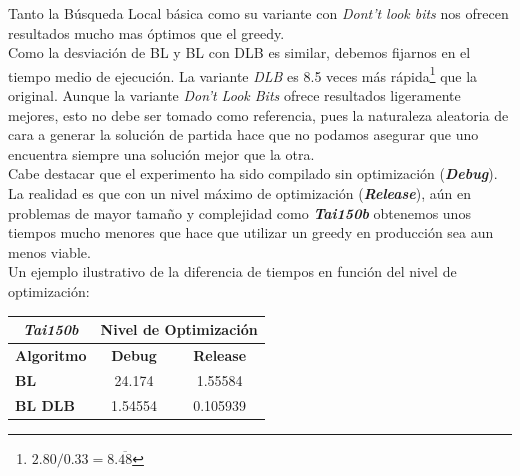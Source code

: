 \documentclass[a4paper, 12pt]{article}
\begin{document}
      Tanto la Búsqueda Local básica como su variante con \textit{Dont't look bits} nos ofrecen resultados mucho mas óptimos que el greedy. \\
      
      Como la desviación de BL y BL con DLB es similar, debemos fijarnos en el tiempo medio de ejecución. La variante \textit{DLB} es 8.5 veces más rápida\footnote{$2.80/0.33 = 8.\overline{48}$} que la original. Aunque la variante \textit{Don't Look Bits} ofrece resultados ligeramente mejores, esto no debe ser tomado como referencia, pues la naturaleza aleatoria de cara a generar la solución de partida hace que no podamos asegurar que uno encuentra siempre una solución mejor que la otra.\\
      
      Cabe destacar que el experimento ha sido compilado sin optimización (\textbf{\textit{Debug}}). La realidad es que con un nivel máximo de optimización (\textbf{\textit{Release}}), aún en problemas de mayor tamaño y complejidad como \textbf{\textit{Tai150b}} obtenemos unos tiempos mucho menores que hace que utilizar un greedy en producción sea aun menos viable.\\
      
      Un ejemplo ilustrativo de la diferencia de tiempos en función del nivel de optimización:
      
\begin{table}[H]
\centering
\label{my-label}
\begin{tabular}{l|c|c|}
\cline{2-3}
\multicolumn{1}{c|}{{\textit{Tai150b}}} & \multicolumn{2}{c|}{\textbf{Nivel de Optimización}} \\ \hline
\multicolumn{1}{|c|}{\textbf{Algoritmo}}    & \textbf{Debug}          & \textbf{Release}          \\ \hline
\multicolumn{1}{|l|}{\textbf{BL}}           & 24.174                  & 1.55584                   \\ \hline
\multicolumn{1}{|l|}{\textbf{BL DLB}}       & 1.54554                 & 0.105939                  \\ \hline
\end{tabular}
\end{table}
   
\printindex
\end{document}
